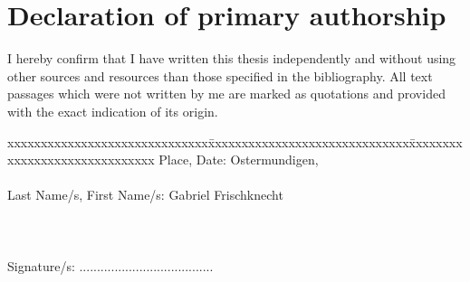 \chapter*{Declaration of primary authorship}
\label{chap:declaration_authorship}

\vspace*{10mm} 

I hereby confirm that I  have written this thesis independently and without using other sources and resources than those specified in the bibliography. All text passages which were not written by me are marked as quotations and provided with the exact indication of its origin. 

\vspace{15mm}

\begin{tabbing}
xxxxxxxxxxxxxxxxxxxxxxxxxxxxxx\=xxxxxxxxxxxxxxxxxxxxxxxxxxxxxx\=xxxxxxxxxxxxxxxxxxxxxxxxxxxxxx\kill
Place, Date:		\> Ostermundigen, \versiondate \\ \\ 
Last Name/s, First Name/s:	\> Gabriel Frischknecht 	 \\ \\ \\ \\ 
Signature/s:	\> ......................................\> \\
\end{tabbing}
